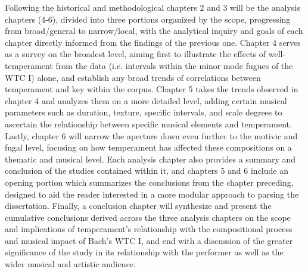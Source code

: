 Following the historical and methodological chapters 2 and 3 will be the
analysis chapters (4-6), divided into three portions organized by the
scope, progressing from broad/general to narrow/local, with the
analytical inquiry and goals of each chapter directly informed from the
findings of the previous one. Chapter 4 serves as a survey on the
broadest level, aiming first to illustrate the effects of
well-temperament from the data (i.e. intervals within the minor mode
fugues of the WTC I) alone, and establish any broad trends of
correlations between temperament and key within the corpus. Chapter 5
takes the trends observed in chapter 4 and analyzes them on a more
detailed level, adding certain musical parameters such as duration,
texture, specific intervals, and scale degrees to ascertain the
relationship between specific musical elements and temperament. Lastly,
chapter 6 will narrow the aperture down even further to the motivic and
fugal level, focusing on how temperament has affected these compositions
on a thematic and musical level. Each analysis chapter also provides a
summary and conclusion of the studies contained within it, and chapters
5 and 6 include an opening portion which summarizes the conclusions from
the chapter preceding, designed to aid the reader interested in a more
modular approach to parsing the dissertation. Finally, a conclusion
chapter will synthesize and present the cumulative conclusions derived
across the three analysis chapters on the scope and implications of
temperament's relationship with the compositional process and musical
impact of Bach's WTC I, and end with a discussion of the greater
significance of the study in its relationship with the performer as well
as the wider musical and artistic audience.


    
    
    
